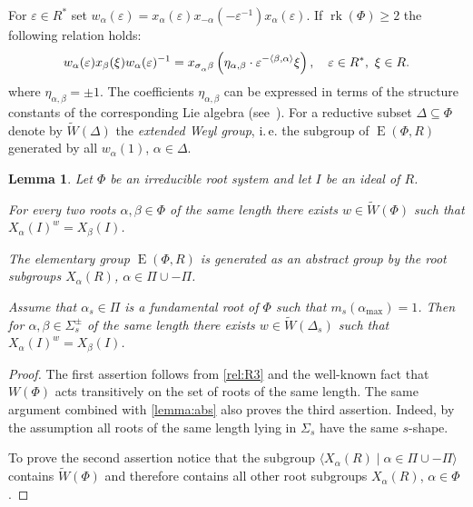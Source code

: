 \documentclass[11pt]{amsart}
\theoremstyle{plain}
\numberwithin{equation}{section}
\newtheorem{lemma}{Lemma}
\numberwithin{lemma}{section}
\theoremstyle{definition}
\theoremstyle{remark}
\DeclareMathOperator{\E}{E}
\DeclareMathOperator{\rk}{rk}
\def\ssub#1{\mathchoice
   {_{\lower2pt\hbox{$\scriptstyle #1$}}}
   {_{\lower2pt\hbox{$\scriptstyle #1$}}}
   {_{\lower1.5pt\hbox{$\scriptscriptstyle #1$}}}
   {_{\!\lower1.5pt\hbox{$\scriptscriptstyle #1$}}}}
\begin{document}
For $\varepsilon\in R^*$ set $w_\alpha(\varepsilon) = x_\alpha(\varepsilon) x_{-\alpha}(-\varepsilon^{-1}) x_{\alpha}(\varepsilon).$
If $\rk(\Phi)\geqslant 2$ the following relation holds:
\begin{equation}\label{rel:R3}
w_\alpha(\varepsilon) x_{\beta}(\xi) w_\alpha(\varepsilon)^{-1} =
x_{\sigma\ssub{\alpha}\beta} \left(\eta_{\alpha, \beta}\cdot\varepsilon^{-\langle\beta, \alpha \rangle}\xi\right), \quad \varepsilon\in R^*, \ \xi\in R.
\end{equation}
where $\eta_{\alpha, \beta}=\pm 1$. The coefficients $\eta_{\alpha, \beta}$ can be expressed in terms of the structure constants of the corresponding Lie algebra (see~\cite[\S13]{VP}).
For a reductive subset $\Delta \subseteq \Phi$ denote by $\widetilde{W}(\Delta)$ the \emph{extended Weyl group}, i.\,e. the subgroup of $\E(\Phi, R)$ generated by all $w_{\alpha}(1)$, $\alpha \in \Delta$.
\begin{lemma} \label{lemma:weylfacts} Let $\Phi$ be an irreducible root system and let $I$ be an ideal of $R$. 
\begin{lemlist}
\item \label{item-trans1} For every two roots $\alpha, \beta \in \Phi$ of the same length there exists $w \in \widetilde{W}(\Phi)$ such that $X_{\alpha}(I)^w = X_\beta(I)$.
\item \label{item-egen} The elementary group $\E(\Phi, R)$  is generated as an abstract group by the root subgroups $X_{\alpha}(R)$, $\alpha \in \Pi \cup -\Pi$.
\item \label{item-trans2} Assume that $\alpha_s\in \Pi$ is a fundamental root of $\Phi$ such that $m_s(\alpha_\mathrm{max}) = 1$. 
Then for $\alpha, \beta \in \Sigma^\pm_s$ of the same length there exists $w\in \widetilde{W}(\Delta_s)$ such that $X_\alpha(I)^w = X_\beta(I)$. \end{lemlist}
\end{lemma}
\begin{proof}
The first assertion follows from \eqref{rel:R3} and the well-known fact that $W(\Phi)$ acts transitively on the set of roots of the same length.
The same argument combined with \cref{lemma:abs} also proves the third assertion. Indeed, by the assumption all roots of the same length lying in $\Sigma_s$ have the same $s$-shape.
 
To prove the second assertion notice that the subgroup $\langle X_\alpha(R) \mid \alpha \in \Pi \cup -\Pi \rangle$ contains $\widetilde{W}(\Phi)$ and therefore contains all other root subgroups $X_\alpha(R)$, $\alpha\in \Phi$. \end{proof}
\end{document}
